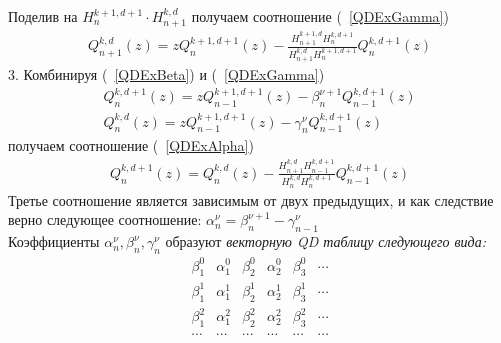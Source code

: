 Поделив на $H_{n}^{k+1,d+1}\cdot H_{n+1}^{k,d}$ получаем
соотношение (~\ref{QDExGamma})
\begin{eqnarray}
Q_{n+1}^{k,d} (z)=zQ_{n}^{k+1,d+1}(z)
-\frac{H^{k+1,d}_{n+1}H_{n}^{k,d+1} }{H_{n+1}^{k,d}
H_{n}^{k+1,d+1}} Q_{n}^{k,d+1}  (z) \nonumber
\end{eqnarray}
3. Комбинируя (~\ref{QDExBeta}) и (~\ref{QDExGamma})
\begin{eqnarray}
Q_{n}^{k,d+1} (z)=zQ_{n-1}^{k+1,d+1}(z)
-\beta_{n}^{{\nu+1}}
Q_{n-1}^{k,d+1}  (z) \nonumber \\
Q_{n}^{k,d} (z)=zQ_{n-1}^{k+1,d+1}(z) - \gamma_{n}^{\nu}
Q_{n-1}^{k,d+1}  (z) \nonumber
\end{eqnarray}
получаем соотношение (~\ref{QDExAlpha})
\begin{eqnarray}
Q_n^{k,d+1}(z)=Q_n^{k,d}(z)-\frac{H^{k,d}_{n+1}H_{n-1}^{k,d+1}
}{H_{n}^{k,d} H_{n}^{k,d+1}} Q_{n-1}^{k,d+1}(z) \nonumber
\end{eqnarray}
Третье соотношение является зависимым от двух предыдущих, и как
следствие верно следующее соотношение: $
\alpha_n^{\nu}=\beta_n^{\nu+1}-\gamma_{n-1}^{\nu} $ \\
Коэффициенты $\alpha_n^{\nu}, \beta_n^{\nu}, \gamma_n^{\nu}$
образуют \it векторную QD таблицу \rm следующего вида:
\begin{equation}
\begin{array}{ccccccccccccccccc}
\beta_1^0 & \alpha_1^0 & \beta_2^0 & \alpha_2^0 & \beta_3^0 & \cdots \\
\beta_1^1 & \alpha_1^1 & \beta_2^1 & \alpha_2^1 & \beta_3^1 & \cdots \\
\beta_1^2 & \alpha_1^2 & \beta_2^2 & \alpha_2^2 & \beta_3^2 & \cdots \\
\cdots & \cdots & \cdots & \cdots & \cdots & \cdots  \\
\end{array}
\end{equation}

